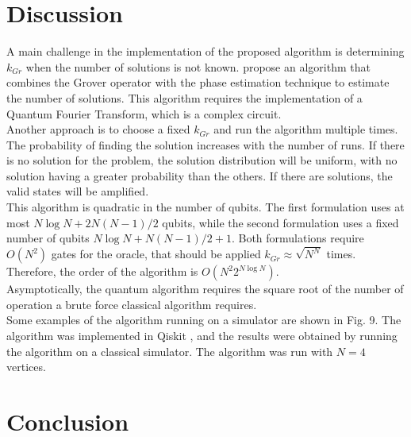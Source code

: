 \documentclass[10pt,a4paper]{article}
\begin{document}
\section{Discussion}
A main challenge in the implementation of the proposed algorithm is determining $k_{Gr}$ when the number of solutions is not known. \cite{Nielsen_Chuang_2010} propose an algorithm that combines the Grover operator with the phase estimation technique to estimate the number of solutions. This algorithm requires the implementation of a Quantum Fourier Transform, which is a complex circuit.\\
Another approach is to choose a fixed $k_{Gr}$ and run the algorithm multiple times. The probability of finding the solution increases with the number of runs. If there is no solution for the problem, the solution distribution will be uniform, with no solution having a greater probability than the others. If there are solutions, the valid states will be amplified.\\
This algorithm is quadratic in the number of qubits. The first formulation uses at most $N\log{N} + 2 N(N-1)/2$ qubits, while the second formulation uses a fixed number of qubits $N \log{N} + N(N-1)/2 + 1$. Both formulations require $O(N^2)$ gates for the oracle, that should be applied $k_{Gr}\approx \sqrt{N^N}$ times. Therefore, the order of the algorithm is $O(N^2 2^{N \log N})$.\\
Asymptotically, the quantum algorithm requires the square root of the number of operation a brute force classical algorithm requires. \\
Some examples of the algorithm running on a simulator are shown in Fig. 9. The algorithm was implemented in Qiskit \cite{Qiskit}, and the results were obtained by running the algorithm on a classical simulator. The algorithm was run with $N = 4$ vertices.


\section{Conclusion}


 

\end{document}
